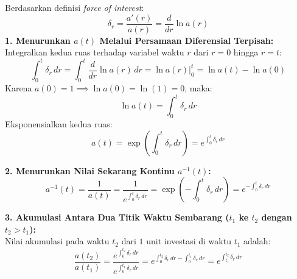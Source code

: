 \documentclass[11pt,a4paper]{article}
\begin{document}
\begin{notebox}
Berdasarkan definisi \textit{force of interest}:
\begin{equation*}
    \delta_r = \frac{a'(r)}{a(r)} = \frac{d}{dr}\ln a(r)
\end{equation*}
\textbf{1. Menurunkan $a(t)$ Melalui Persamaan Diferensial Terpisah:}\\
Integralkan kedua ruas terhadap variabel waktu $r$ dari $r = 0$ hingga $r = t$:
\begin{equation*}
    \int_0^t \delta_r \, dr = \int_0^t \frac{d}{dr}\ln a(r) \, dr = \left. \ln a(r) \right|_0^t = \ln a(t) - \ln a(0)
\end{equation*}
Karena $a(0) = 1 \implies \ln a(0) = \ln(1) = 0$, maka:
\begin{equation*}
    \ln a(t) = \int_0^t \delta_r \, dr
\end{equation*}
Eksponensialkan kedua ruas:
\begin{equation}
    a(t) = \exp\left(\int_0^t \delta_r \, dr\right) = e^{\int_0^t \delta_r \, dr}
\end{equation}

\textbf{2. Menurunkan Nilai Sekarang Kontinu $a^{-1}(t)$:}
\begin{equation}
    a^{-1}(t) = \frac{1}{a(t)} = \frac{1}{e^{\int_0^t \delta_r \, dr}} = \exp\left(-\int_0^t \delta_r \, dr\right) = e^{-\int_0^t \delta_r \, dr}
\end{equation}

\textbf{3. Akumulasi Antara Dua Titik Waktu Sembarang ($t_1$ ke $t_2$ dengan $t_2 > t_1$):}\\
Nilai akumulasi pada waktu $t_2$ dari $1$ unit investasi di waktu $t_1$ adalah:
\begin{equation}
    \frac{a(t_2)}{a(t_1)} = \frac{e^{\int_0^{t_2} \delta_r \, dr}}{e^{\int_0^{t_1} \delta_r \, dr}} = e^{\int_0^{t_2}\delta_r \, dr - \int_0^{t_1}\delta_r \, dr} = e^{\int_{t_1}^{t_2} \delta_r \, dr}
\end{equation}
\end{notebox}
\end{document}
